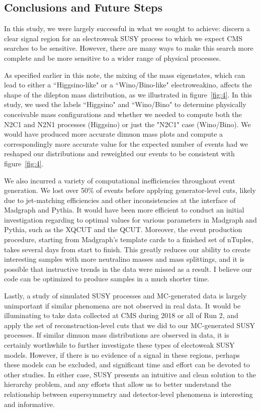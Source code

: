 \documentclass{article}
\begin{document}
\subsection{Conclusions and Future Steps}
In this study, we were largely successful in what we sought to achieve: discern a clear signal region for an electroweak SUSY process to which we expect CMS searches to be sensitive. However, there are many ways to make this search more complete and be more sensitive to a wider range of physical processes.
\par
As specified earlier in this note, the mixing of the mass eigenstates, which can lead to either a ``Higgsino-like" or a ``Wino/Bino-like" electroweakino, affects the shape of the dilepton mass distribution, as we illustrated in figure~\ref{fig:4}. In this study, we used the labels ``Higgsino" and ``Wino/Bino" to determine physically conceivable mass configurations and whether we needed to compute both the N2C1 and N2N1 processes (Higgsino) or just the "N2C1" case
(Wino/Bino). We would have produced more accurate dimuon mass plots and compute a correspondingly more accurate value for the expected number of events had we reshaped our distributions and reweighted our events to be consistent with figure~\ref{fig:4}.
\par
We also incurred a variety of computational inefficiencies throughout event generation. We lost over 50\% of events before applying generator-level cuts, likely due to jet-matching efficiencies and other inconsistencies at the interface of Madgraph and Pythia. It would have been more efficient to conduct an initial investigation regarding to optimal values for various parameters in Madgraph and Pythia, such as the XQCUT and the QCUT. Moreover, the event production procedure, starting from Madgraph's template cards to a finished set of nTuples, takes several days from start to finish. This greatly reduces our ability to create interesting samples with more neutralino masses and mass splittings, and it is possible that instructive trends in the data were missed as a result. I believe our code can be optimized to produce samples in a much shorter time.
\par
Lastly, a study of simulated SUSY processes and MC-generated data is largely unimportant if similar phenomena are not observed in real data. It would be illuminating to take data collected at CMS during 2018 or all of Run 2, and apply the set of reconstruction-level cuts that we did to our MC-generated SUSY processes. If similar dimuon mass distributions are observed in data, it is certainly worthwhile to further investigate these types of electoweak SUSY models. However, if there is no evidence of a signal in these regions, perhaps these models can be excluded, and significant time and effort can be devoted to other studies. In either case, SUSY presents an intuitive and clean solution to the hierarchy problem, and any efforts that allow us to better understand the relationship between supersymmetry and detector-level phenomena is interesting and informative.
\end{document}

